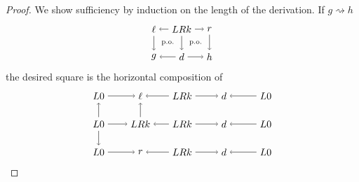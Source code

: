 \documentclass{amsart}
\newcommand{\dderiv}[2]{#1 \rightsquigarrow #2}
\theoremstyle{remark}
\theoremstyle{definition}
\begin{document}
\begin{proof}
  We show sufficiency by induction on the length of the derivation. If
  $ \dderiv{g}{h} $
  \[
  \begin{tikzpicture}
    \node (1t) at (0,1) {$ \ell $};
    \node (2t) at (1,1) {$ LRk $};
    \node (3t) at (2,1) {$ r $};
    \node (1b) at (0,0) {$ g $};
    \node (2b) at (1,0) {$ d $};
    \node (3b) at (2,0) {$ h $};
    \draw [->] (2t) to node [] {\scriptsize{$  $}} (1t);
    \draw [->] (2t) to node [] {\scriptsize{$  $}} (3t);
    \draw [->] (2b) to node [] {\scriptsize{$  $}} (1b);
    \draw [->] (2b) to node [] {\scriptsize{$  $}} (3b);
    \draw [->] (1t) to node [] {\scriptsize{$  $}} (1b);
    \draw [->] (2t) to node [] {\scriptsize{$  $}} (2b);
    \draw [->] (3t) to node [] {\scriptsize{$  $}} (3b);
    \node () at (0.5,0.5) {\scriptsize{p.o.}};
    \node () at (1.5,0.5) {\scriptsize{p.o.}};
  \end{tikzpicture}
  \]
  the desired square is the horizontal composition of
  \[
    \begin{tikzpicture}
    \begin{scope}
      \node (1t) at (0,2) {$ L0 $};
      \node (2t) at (1.5,2) {$ \ell $};
      \node (3t) at (3,2) {$ LRk $};
      \node (4t) at (4.5,2) {$ d $};
      \node (5t) at (6,2) {$ L0 $};
      \node (1m) at (0,1) {$ L 0 $};
      \node (2m) at (1.5,1) {$ LRk $};
      \node (3m) at (3,1) {$ LRk $};
      \node (4m) at (4.5,1) {$ d $};
      \node (5m) at (6,1) {$ L 0 $};
      \node (1b) at (0,0) {$ L 0 $};
      \node (2b) at (1.5,0) {$ r $};
      \node (3b) at (3,0) {$ LRk $};
      \node (4b) at (4.5,0) {$ d $};
      \node (5b) at (6,0) {$ L 0 $};
      \draw [->] (1t) to node [] {\scriptsize{$  $}} (2t);
      \draw [->] (3t) to node [] {\scriptsize{$  $}} (2t);
      \draw [->] (3t) to node [] {\scriptsize{$  $}} (4t);
      \draw [->] (5t) to node [] {\scriptsize{$  $}} (4t);
      \draw [->] (1m) to node [] {\scriptsize{$  $}} (2m);
      \draw [->] (3m) to node [] {\scriptsize{$  $}} (2m);
      \draw [->] (3m) to node [] {\scriptsize{$  $}} (4m);
      \draw [->] (5m) to node [] {\scriptsize{$  $}} (4m);
      \draw [->] (1b) to node [] {\scriptsize{$  $}} (2b);
      \draw [->] (3b) to node [] {\scriptsize{$  $}} (2b);
      \draw [->] (3b) to node [] {\scriptsize{$  $}} (4b);
      \draw [->] (5b) to node [] {\scriptsize{$  $}} (4b);
      \draw [->] (1m) to node [] {\scriptsize{$  $}} (1t);
      \draw [->] (1m) to node [] {\scriptsize{$  $}} (1b);
      \draw [->] (2m) to node [] {\scriptsize{$  $}} (2t);

\end{scope}
\end{tikzpicture}\]
\end{proof}
\end{document}
